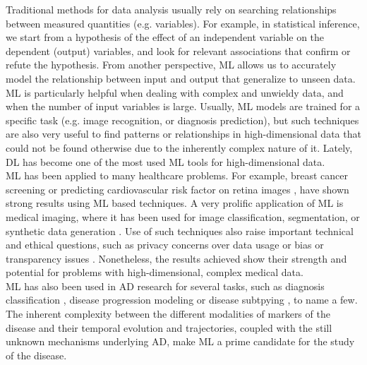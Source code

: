 Traditional methods for data analysis usually rely on searching relationships between measured quantities (e.g. variables). For example, in statistical inference, we start from a hypothesis of the effect of an independent variable on the dependent (output) variables, and look for relevant associations that confirm or refute the hypothesis. From another perspective, ML allows us to accurately model the relationship between input and output that generalize to unseen data. ML is particularly helpful when dealing with complex and unwieldy data, and when the number of input variables is large. Usually, ML models are trained for a specific task (e.g. image recognition, or diagnosis prediction), but such techniques are also very useful to find patterns or relationships in high-dimensional data that could not be found otherwise due to the inherently complex nature of it. Lately, DL has become one of the most used ML tools for high-dimensional data. \\

ML has been applied to many healthcare problems. For example, breast cancer screening \cite{McKinney2020} or predicting cardiovascular risk factor on retina images \cite{Poplin2018}, have shown strong results using ML based techniques. A very prolific application of ML is medical imaging, where it has been used for image classification, segmentation, or synthetic data generation \cite{Litjens2017}. Use of such techniques also raise important technical and ethical questions, such as privacy concerns over data usage \cite{Yang2019} or bias or transparency issues \cite{Karikari2020, Haibe-Kains2020}. Nonetheless, the results achieved show their strength and potential for problems with high-dimensional, complex medical data. \\

ML has also been used in AD research for several tasks, such as diagnosis classification \cite{Rathore2017}, disease progression modeling \cite{Oxtoby2017} or disease subtpying \cite{Young2017}, to name a few. The inherent complexity between the different modalities of markers of the disease and their temporal evolution and trajectories, coupled with the still unknown mechanisms underlying AD, make ML a prime candidate for the study of the disease. \\


